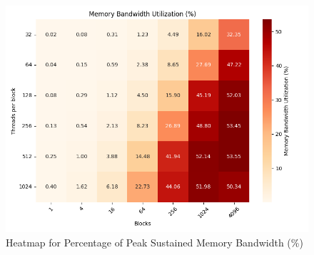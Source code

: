 \begin{figure}[htbp]
    \includegraphics[width=1.0\linewidth]{images/Memory Bandwidth Utilization.png}
    \caption{Heatmap for Percentage of Peak Sustained Memory Bandwidth (\%)}
    \label{fig:memory_bandwidth_heatmap}
\end{figure}